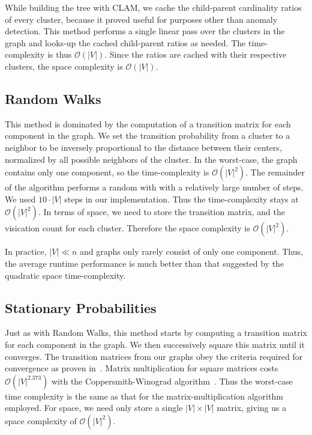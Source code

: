 \documentclass{article}
\begin{document}
While building the tree with CLAM, we cache the child-parent cardinality ratios of every cluster, because it proved useful for purposes other than anomaly detection.
This method performs a single linear pass over the clusters in the graph and looks-up the cached child-parent ratios as needed.
The time-complexity is thus $\mathcal{O}(|V|)$.
Since the ratios are cached with their respective clusters, the space complexity is $\mathcal{O}(|V|)$.

\subsection{Random Walks}

This method is dominated by the computation of a transition matrix for each component in the graph.
We set the transition probability from a cluster to a neighbor to be inversely proportional to the distance between their centers, normalized by all possible neighbors of the cluster.
In the worst-case, the graph contains only one component, so the time-complexity is $\mathcal{O}(|V|^2)$.
The remainder of the algorithm performs a random with with a relatively large number of steps.
We used $10 \cdot |V|$ steps in our implementation.
Thus the time-complexity stays at $\mathcal{O}(|V|^2)$.
In terms of space, we need to store the transition matrix, and the visication count for each cluster.
Therefore the space complexity is $\mathcal{O}(|V|^2)$.

In practice, $|V| \ll n$ and graphs only rarely consist of only one component.
Thus, the average runtime performance is much better than that suggested by the quadratic space time-complexity.

\subsection{Stationary Probabilities}

Just as with Random Walks, this method starts by computing a transition matrix for each component in the graph.
We then successively square this matrix until it converges.
The transition matrices from our graphs obey the criteria required for convergence as proven in~\cite{levin2017markov}.
Matrix multiplication for square matrices costs $\mathcal{O}(|V|^{2.373})$ with the Coppersmith-Winograd algorithm~\cite{coppersmith1987matrix}.
Thus the worst-case time complexity is the same as that for the matrix-multiplication algorithm employed.
For space, we need only store a single $|V| \times |V|$ matrix, giving us a space complexity of $\mathcal{O}(|V|^2)$.
\end{document}
